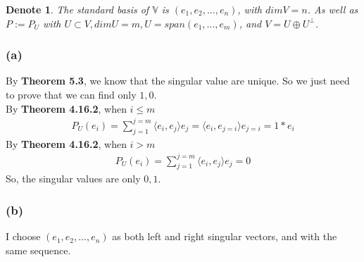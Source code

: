 \documentclass{article}
\newtheorem*{denote}{Denote}
\begin{document}
\begin{denote}
    The standard basis of $\mathbb{V}$ is $(e_1, e_2, ..., e_n)$, with $dimV = n$. As well as $P := P_U$ with $U \subset V, dim U = m, U = span(e_1, ..., e_m)$, and $V = U \oplus  U^\bot$.
\end{denote}
\subsubsection*{(a)}

By \textbf{Theorem 5.3}, we know that the singular value are unique. So we just need to prove that we can find only $1, 0$. \\
By \textbf{Theorem 4.16.2}, when $i \le m$
\begin{equation*}
    \begin{split}
        P_U(e_i) = \sum_{j = 1}^{j = m} \langle e_i, e_j \rangle e_j = \langle e_i, e_{j=i} \rangle e_{j = i} = 1 * e_i
    \end{split}
\end{equation*}
By \textbf{Theorem 4.16.2}, when $i > m$
\begin{equation*}
    \begin{split}
        P_U(e_i) = \sum_{j = 1}^{j = m} \langle e_i, e_j \rangle e_j = 0
    \end{split}
\end{equation*}
So, the singular values are only $0, 1$. 

\subsubsection*{(b)}
I choose $(e_1, e_2, ..., e_n)$ as both left and right singular vectors, and with the same sequence.
\end{document}
